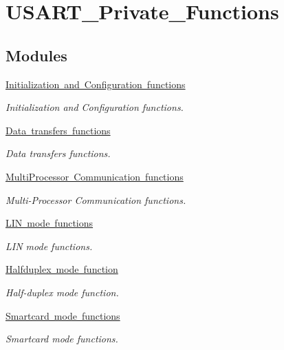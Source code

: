 \hypertarget{group___u_s_a_r_t___private___functions}{}\section{U\+S\+A\+R\+T\+\_\+\+Private\+\_\+\+Functions}
\label{group___u_s_a_r_t___private___functions}
\subsection*{Modules}
\begin{DoxyCompactItemize}
\item 
\mbox{\hyperlink{group___u_s_a_r_t___group1}{Initialization and Configuration functions}}
\begin{DoxyCompactList}\small\item\em Initialization and Configuration functions. \end{DoxyCompactList}\item 
\mbox{\hyperlink{group___u_s_a_r_t___group2}{Data transfers functions}}
\begin{DoxyCompactList}\small\item\em Data transfers functions. \end{DoxyCompactList}\item 
\mbox{\hyperlink{group___u_s_a_r_t___group3}{Multi\+Processor Communication functions}}
\begin{DoxyCompactList}\small\item\em Multi-\/\+Processor Communication functions. \end{DoxyCompactList}\item 
\mbox{\hyperlink{group___u_s_a_r_t___group4}{L\+I\+N mode functions}}
\begin{DoxyCompactList}\small\item\em L\+IN mode functions. \end{DoxyCompactList}\item 
\mbox{\hyperlink{group___u_s_a_r_t___group5}{Halfduplex mode function}}
\begin{DoxyCompactList}\small\item\em Half-\/duplex mode function. \end{DoxyCompactList}\item 
\mbox{\hyperlink{group___u_s_a_r_t___group6}{Smartcard mode functions}}
\begin{DoxyCompactList}\small\item\em Smartcard mode functions. \end{DoxyCompactList}\item 

\end{DoxyCompactItemize}
